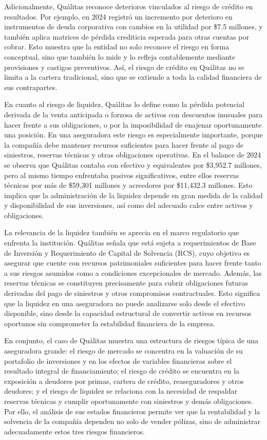 Adicionalmente, Quálitas reconoce deterioros vinculados al riesgo de crédito en resultados. Por ejemplo, en 2024 registró un incremento por deterioro en instrumentos de deuda corporativa con cambios en la utilidad por \$7.5 millones, y también aplica matrices de pérdida crediticia esperada para otras cuentas por cobrar. Esto muestra que la entidad no solo reconoce el riesgo en forma conceptual, sino que también lo mide y lo refleja contablemente mediante provisiones y castigos preventivos. Así, el riesgo de crédito en Quálitas no se limita a la cartera tradicional, sino que se extiende a toda la calidad financiera de sus contrapartes.

En cuanto al riesgo de liquidez, Quálitas lo define como la pérdida potencial derivada de la venta anticipada o forzosa de activos con descuentos inusuales para hacer frente a sus obligaciones, o por la imposibilidad de enajenar oportunamente una posición. En una aseguradora este riesgo es especialmente importante, porque la compañía debe mantener recursos suficientes para hacer frente al pago de siniestros, reservas técnicas y otras obligaciones operativas. En el balance de 2024 se observa que Quálitas contaba con efectivo y equivalentes por \$3{,}952.7 millones, pero al mismo tiempo enfrentaba pasivos significativos, entre ellos reservas técnicas por más de \$59{,}301 millones y acreedores por \$11{,}432.3 millones. Esto implica que la administración de la liquidez depende en gran medida de la calidad y disponibilidad de sus inversiones, así como del adecuado calce entre activos y obligaciones.

La relevancia de la liquidez también se aprecia en el marco regulatorio que enfrenta la institución. Quálitas señala que está sujeta a requerimientos de Base de Inversión y Requerimiento de Capital de Solvencia (RCS), cuyo objetivo es asegurar que cuente con recursos patrimoniales suficientes para hacer frente tanto a sus riesgos asumidos como a condiciones excepcionales de mercado. Además, las reservas técnicas se constituyen precisamente para cubrir obligaciones futuras derivadas del pago de siniestros y otros compromisos contractuales. Esto significa que la liquidez en una aseguradora no puede analizarse solo desde el efectivo disponible, sino desde la capacidad estructural de convertir activos en recursos oportunos sin comprometer la estabilidad financiera de la empresa.

En conjunto, el caso de Quálitas muestra una estructura de riesgos típica de una aseguradora grande: el riesgo de mercado se concentra en la valuación de su portafolio de inversiones y en los efectos de variables financieras sobre el resultado integral de financiamiento; el riesgo de crédito se encuentra en la exposición a deudores por primas, cartera de crédito, reaseguradores y otros deudores; y el riesgo de liquidez se relaciona con la necesidad de respaldar reservas técnicas y cumplir oportunamente con siniestros y demás obligaciones. Por ello, el análisis de sus estados financieros permite ver que la rentabilidad y la solvencia de la compañía dependen no solo de vender pólizas, sino de administrar adecuadamente estos tres riesgos financieros.

